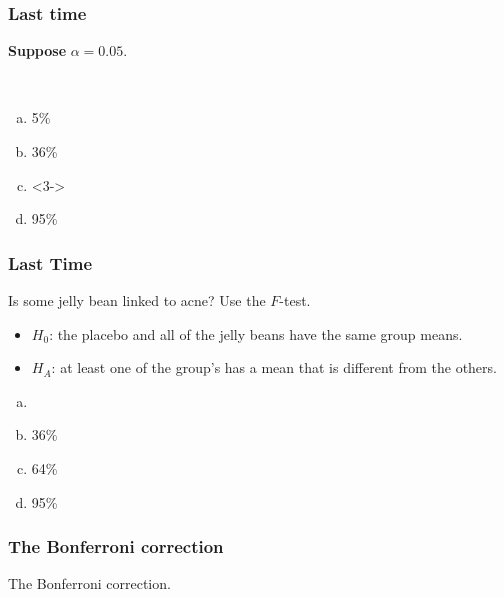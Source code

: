 \documentclass[slidestop,compress,mathserif,12pt,t,professionalfonts,xcolor=table]{beamer}
\newcommand{\solnMult}[1]{
\only<1>{#1}
\only<2->{\red{\textbf{#1}}}
}
\newcommand{\solnMultOn}[3]{
\only<#1>{#3}
\only<{#2}->{\red{\textbf{#3}}}
}
\begin{document}
\begin{frame}
  \frametitle{Last time}

  \textbf{Suppose} $\alpha = 0.05$.


    \pause

    \hfill \\

      \begin{enumerate}[(a)]
      \item 5\%
      \item 36\%
      \item \solnMultOn{2}{3}{64\%}
      \item 95\%
      \end{enumerate}

\end{frame}


\begin{frame}
  \frametitle{Last Time}

Is some jelly bean linked to acne?  Use the $F$-test.

\begin{itemize}
\item $H_0$: the placebo and all of the jelly beans have the same group means.

\item $H_A$: at least one of the group's has a mean that is different from the others.
\end{itemize}

\begin{enumerate}[(a)]
\item \solnMult{5\%}
\item 36\%
\item 64\%
\item 95\%
\end{enumerate}

\end{frame}


\begin{frame}
  \frametitle{The Bonferroni correction}

  \vfill 


  \begin{center}
  The Bonferroni correction.
  \end{center}

  \vfill

\end{frame}
\end{document}
